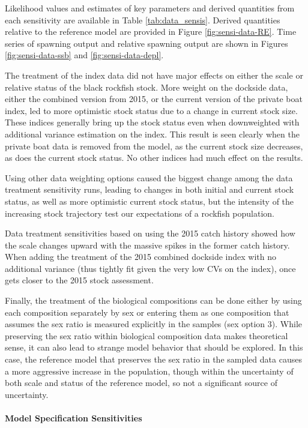 \documentclass[11pt,
  letterpaper,
]{article}
\begin{document}
Likelihood values and estimates of key parameters and derived quantities from each sensitivity are available in Table \ref{tab:data_sensis}. Derived quantities relative to the reference model are provided in Figure \ref{fig:sensi-data-RE}. Time series of spawning output and relative spawning output are shown in Figures \ref{fig:sensi-data-ssb} and \ref{fig:sensi-data-depl}.

The treatment of the index data did not have major effects on either the scale or relative status of the black rockfish stock. More weight on the dockside data, either the combined version from 2015, or the current version of the private boat index, led to more optimistic stock status due to a change in current stock size. These indices generally bring up the stock status even when downweighted with additional variance estimation on the index. This result is seen clearly when the private boat data is removed from the model, as the current stock size decreases, as does the current stock status. No other indices had much effect on the results.

Using other data weighting options caused the biggest change among the data treatment sensitivity runs, leading to changes in both initial and current stock status, as well as more optimistic current stock status, but the intensity of the increasing stock trajectory test our expectations of a rockfish population.

Data treatment sensitivities based on using the 2015 catch history showed how the scale changes upward with the massive spikes in the former catch history. When adding the treatment of the 2015 combined dockside index with no additional variance (thus tightly fit given the very low CVs on the index), once gets closer to the 2015 stock assessment.

Finally, the treatment of the biological compositions can be done either by using each composition separately by sex or entering them as one composition that assumes the sex ratio is measured explicitly in the samples (sex option 3). While preserving the sex ratio within biological composition data makes theoretical sense, it can also lead to strange model behavior that should be explored. In this case, the reference model that preserves the sex ratio in the sampled data causes a more aggressive increase in the population, though within the uncertainty of both scale and status of the reference model, so not a significant source of uncertainty.

\hypertarget{senstivities}{%
\paragraph{Model Specification Sensitivities}\label{senstivities}}
\end{document}
